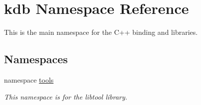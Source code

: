 \hypertarget{namespacekdb}{\section{kdb Namespace Reference}
\label{namespacekdb}
}


This is the main namespace for the C++ binding and libraries.  


\subsection*{Namespaces}
\begin{DoxyCompactItemize}
\item 
namespace \hyperlink{namespacekdb_1_1tools}{tools}
\begin{DoxyCompactList}\small\item\em This namespace is for the libtool library. \end{DoxyCompactList}\end{DoxyCompactItemize}
